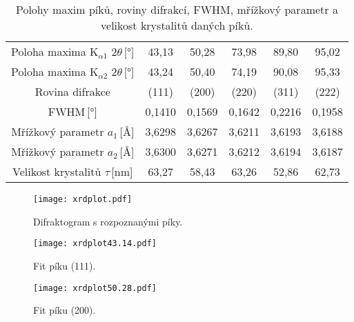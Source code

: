 \documentclass[a4paper,12pt]{article}
\begin{document}
\begin{center}
	\begin{table}[h!]
		\centering
		\caption{\centering Polohy maxim píků, roviny difrakcí, FWHM, mřížkový 
		parametr a velikost krystalitů daných píků.}
		\label{tab:fwhm}
		\begin{tabular}{c|c|c|c|c|c} \toprule
			Poloha maxima K$_{\alpha1}$ $2\theta$\,[\si{\degree}] & 43,13 & 
			50,28 & 73,98 & 
			89,80 & 95,02 
			\\
			Poloha maxima K$_{\alpha2}$ $2\theta$\,[\si{\degree}] & 43,24 &	
			50,40 &	74,19 &	90,08 &	95,33 \\\midrule
			Rovina difrakce & (111) & (200) & (220) & (311) & (222) \\
			FWHM\,[\si{\degree}] & 0,1410 & 0,1569 & 0,1642 & 0,2216 & 0,1958 
			\\ \midrule
			Mřížkový parametr $a_1$\,[\si{\angstrom}] & 3,6298&	3,6267&	3,6211&	
			3,6193&	3,6188 \\
			Mřížkový parametr $a_2$\,[\si{\angstrom}] & 3,6300&	3,6271&	3,6212&	
			3,6194&	3,6187 \\
			Velikost krystalitů $\tau$\,[\si{\nano\meter}] & 63,27 & 58,43 & 
			63,26 & 52,86 & 62,73 \\
				
		\bottomrule
		\end{tabular}
	\end{table}
\end{center}

\begin{figure}[h!]
	\centering
	\texttt{[image: xrdplot.pdf]}
	\caption{\centering Difraktogram s rozpoznanými píky.}
	\label{fig:spectrum}
\end{figure}

\begin{figure}[h!]
	\centering
	\texttt{[image: xrdplot43.14.pdf]}
	\caption{\centering Fit píku (111).}
	\label{fig:43}
\end{figure}

\begin{figure}[h!]
\centering
\texttt{[image: xrdplot50.28.pdf]}
\caption{\centering Fit píku (200).}
\label{fig:50}
\end{figure}
\end{document}
